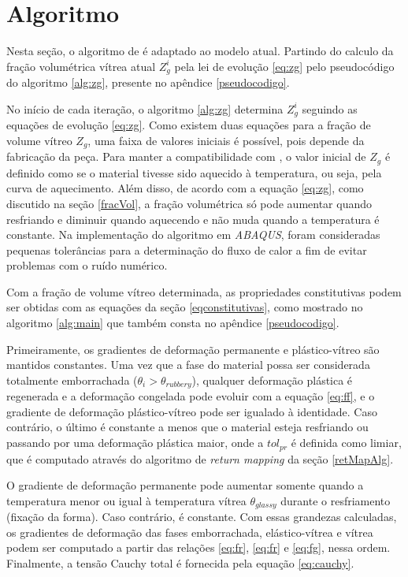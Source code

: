 \section{Algoritmo}

Nesta seção, o algoritmo de \cite{Boatti2016AData} é adaptado ao modelo atual. Partindo do calculo da fração volumétrica vítrea atual $Z_g^i$ pela lei de evolução \eqref{eq:zg} pelo pseudocódigo do algoritmo \ref{alg:zg}, presente no apêndice \ref{pseudocodigo}.

No início de cada iteração, o algoritmo \ref{alg:zg} determina $Z_g^i$ seguindo as equações de evolução \eqref{eq:zg}.
Como existem duas equações para a fração de volume vítreo $Z_g$, uma faixa de valores iniciais é possível, pois depende da fabricação da peça.
Para manter a compatibilidade com \cite{Boatti2016AData}, o valor inicial de $Z_g$ é definido como se o material tivesse sido aquecido à temperatura, ou seja, pela curva de aquecimento.
Além disso, de acordo com a equação \eqref{eq:zg}, como discutido na seção \ref{fracVol}, a fração volumétrica só pode aumentar quando resfriando e diminuir quando aquecendo e não muda quando a temperatura é constante. Na implementação do algoritmo em \textit{ABAQUS}, foram consideradas pequenas tolerâncias para a determinação do fluxo de calor a fim de evitar problemas com o ruído numérico. 

Com a fração de volume vítreo determinada, as propriedades constitutivas podem ser obtidas com as equações da seção \eqref{eqconstitutivas}, como mostrado no algoritmo \ref{alg:main} que também consta no apêndice \ref{pseudocodigo}.

Primeiramente, os gradientes de deformação permanente e plástico-vítreo são mantidos constantes. Uma vez que a fase do material possa ser considerada totalmente emborrachada ($\theta_i > \theta_{rubbery}$), qualquer deformação plástica é regenerada e a deformação congelada pode evoluir com a equação \eqref{eq:ff}, e o gradiente de deformação plástico-vítreo pode ser igualado à identidade. Caso contrário, o último é constante a menos que o material esteja resfriando ou passando por uma deformação plástica maior, onde a $\textit{tol}_{pr}$ é definida como limiar, que é computado através do algoritmo de \textit{return mapping} da seção \eqref{retMapAlg}.

O gradiente de deformação permanente pode aumentar somente quando a temperatura menor ou igual à temperatura vítrea $\theta_{glassy}$ durante o resfriamento (fixação da forma). Caso contrário, é constante. Com essas grandezas calculadas, os gradientes de deformação das fases emborrachada, elástico-vítrea e vítrea podem ser computado a partir das relações \eqref{eq:fr}, \eqref{eq:fr} e \eqref{eq:fg}, nessa ordem.
Finalmente, a tensão Cauchy total é fornecida pela equação \eqref{eq:cauchy}.
